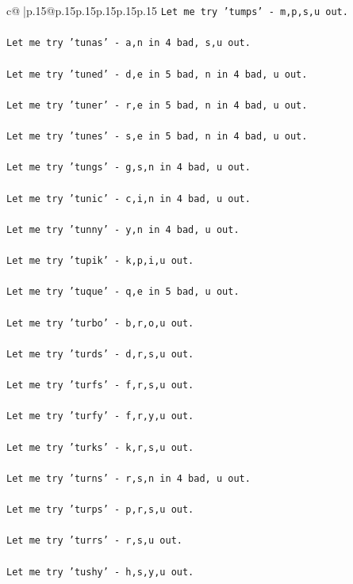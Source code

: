 \documentclass{article}
\begin{document}
{\begin{supertabular}{c@{$\;$}|p{.15\linewidth}@{}p{.15\linewidth}p{.15\linewidth}p{.15\linewidth}p{.15\linewidth}p{.15\linewidth}}
{{{\texttt{Let me try 'tumps' {-} m,p,s,u out. } \\
\\ 
\texttt{Let me try 'tunas' {-} a,n in 4 bad, s,u out. } \\
\\ 
\texttt{Let me try 'tuned' {-} d,e in 5 bad, n in 4 bad, u out. } \\
\\ 
\texttt{Let me try 'tuner' {-} r,e in 5 bad, n in 4 bad, u out. } \\
\\ 
\texttt{Let me try 'tunes' {-} s,e in 5 bad, n in 4 bad, u out. } \\
\\ 
\texttt{Let me try 'tungs' {-} g,s,n in 4 bad, u out. } \\
\\ 
\texttt{Let me try 'tunic' {-} c,i,n in 4 bad, u out. } \\
\\ 
\texttt{Let me try 'tunny' {-} y,n in 4 bad, u out. } \\
\\ 
\texttt{Let me try 'tupik' {-} k,p,i,u out. } \\
\\ 
\texttt{Let me try 'tuque' {-} q,e in 5 bad, u out. } \\
\\ 
\texttt{Let me try 'turbo' {-} b,r,o,u out. } \\
\\ 
\texttt{Let me try 'turds' {-} d,r,s,u out. } \\
\\ 
\texttt{Let me try 'turfs' {-} f,r,s,u out. } \\
\\ 
\texttt{Let me try 'turfy' {-} f,r,y,u out. } \\
\\ 
\texttt{Let me try 'turks' {-} k,r,s,u out. } \\
\\ 
\texttt{Let me try 'turns' {-} r,s,n in 4 bad, u out. } \\
\\ 
\texttt{Let me try 'turps' {-} p,r,s,u out. } \\
\\ 
\texttt{Let me try 'turrs' {-} r,s,u out. } \\
\\ 
\texttt{Let me try 'tushy' {-} h,s,y,u out. } \\
\\ 
}}}
\end{supertabular}}
\end{document}
